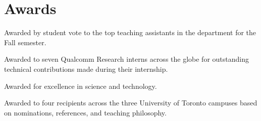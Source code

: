 \section{\sc Awards}

{
  Awarded by student vote to the top teaching assistants in the department for the Fall semester.
}

{
  Awarded to seven Qualcomm Research interns across the globe for outstanding technical contributions made during their internship.
}

{
  Awarded for excellence in science and technology.
}

{
  Awarded to four recipients across the three University of Toronto campuses based on nominations, references, and teaching philosophy.
}
